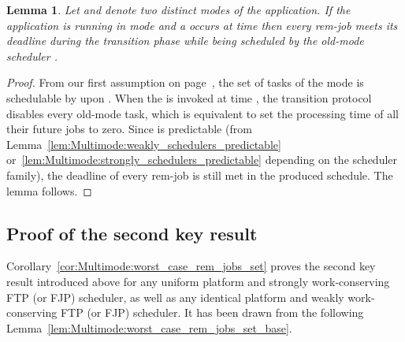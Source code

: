 \documentclass{article}
\newtheorem{validity test}{Validity Test}
\newtheorem{Lemma}{Lemma}
\newtheorem{proof}{Proof}
\begin{document}
\begin{Lemma}
\label{lem:Multimode:remjobs_meet_deadline}
Let  and  denote two distinct modes of the application. If the application is running in mode  and a  occurs at time  then every rem-job meets its deadline during the transition phase while being scheduled by the old-mode scheduler .
\end{Lemma} 
\begin{proof}
From our first assumption on page~\pageref{null:assumption1}, the set of tasks  of the mode  is schedulable by  upon . When the  is invoked at time , the transition protocol disables every old-mode task, which is equivalent to set the processing time of all their future jobs to zero. Since  is predictable (from Lemma~\ref{lem:Multimode:weakly_schedulers_predictable} or~\ref{lem:Multimode:strongly_schedulers_predictable} depending on the scheduler family), the deadline of every rem-job is still met in the produced schedule. The lemma follows.
\end{proof}

\subsection{Proof of the second key result}
\label{sec:Multimode:prelim_validity_tests_second_result}

Corollary~\ref{cor:Multimode:worst_case_rem_jobs_set} proves the second key result introduced above for any uniform platform and strongly work-conserving FTP (or FJP) scheduler, as well as any identical platform and weakly work-conserving FTP (or FJP) scheduler. It has been drawn from the following Lemma~\ref{lem:Multimode:worst_case_rem_jobs_set_base}.
\end{document}
